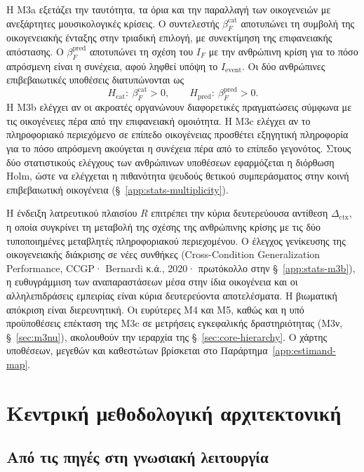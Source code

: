 \documentclass[11pt,a4paper]{article}
\begin{document}
Η M3a εξετάζει την ταυτότητα, τα όρια και την παραλλαγή των οικογενειών με ανεξάρτητες μουσικολογικές κρίσεις. Ο συντελεστής $\beta_F^{\mathrm{cat}}$ αποτυπώνει τη συμβολή της οικογενειακής ένταξης στην τριαδική επιλογή, με συνεκτίμηση της επιφανειακής απόστασης. Ο $\beta_F^{\mathrm{pred}}$ αποτυπώνει τη σχέση του $I_F$ με την ανθρώπινη κρίση για το πόσο απρόσμενη είναι η συνέχεια, αφού ληφθεί υπόψη το $I_{\mathrm{event}}$. Οι δύο ανθρώπινες επιβεβαιωτικές υποθέσεις διατυπώνονται ως
\[
H_{\mathrm{cat}}:\ \beta_F^{\mathrm{cat}}>0,
\qquad
H_{\mathrm{pred}}:\ \beta_F^{\mathrm{pred}}>0.
\]
Η M3b ελέγχει αν οι ακροατές οργανώνουν διαφορετικές πραγματώσεις σύμφωνα με τις οικογένειες πέρα από την επιφανειακή ομοιότητα. Η M3c ελέγχει αν το πληροφοριακό περιεχόμενο σε επίπεδο οικογένειας προσθέτει εξηγητική πληροφορία για το πόσο απρόσμενη ακούγεται η συνέχεια πέρα από το επίπεδο γεγονότος. Στους δύο στατιστικούς ελέγχους των ανθρώπινων υποθέσεων εφαρμόζεται η διόρθωση Holm, ώστε να ελέγχεται η πιθανότητα ψευδούς θετικού συμπεράσματος στην κοινή επιβεβαιωτική οικογένεια (§~\ref{app:stats-multiplicity}).

Η ένδειξη λατρευτικού πλαισίου $R$ επιτρέπει την κύρια δευτερεύουσα αντίθεση $\Delta_{\mathrm{ctx}}$, η οποία συγκρίνει τη μεταβολή της σχέσης της ανθρώπινης κρίσης με τις δύο τυποποιημένες μεταβλητές πληροφοριακού περιεχομένου. Ο έλεγχος γενίκευσης της οικογενειακής διάκρισης σε νέες συνθήκες (Cross-Condition Generalization Performance, CCGP· Bernardi κ.ά., 2020· πρωτόκολλο στην §~\ref{app:stats-m3b}), η ευθυγράμμιση των αναπαραστάσεων μέσα στην ίδια οικογένεια και οι αλληλεπιδράσεις εμπειρίας είναι κύρια δευτερεύοντα αποτελέσματα. Η βιωματική απόκριση είναι διερευνητική. Οι ευρύτερες M4 και M5, καθώς και η υπό προϋποθέσεις επέκταση της M3c σε μετρήσεις εγκεφαλικής δραστηριότητας (M3ν, §~\ref{sec:m3nu}), ακολουθούν την ιεραρχία της §~\ref{sec:core-hierarchy}. Ο χάρτης υποθέσεων, μεγεθών και καθεστώτων βρίσκεται στο Παράρτημα~\ref{app:estimand-map}.

\section{Κεντρική μεθοδολογική αρχιτεκτονική}

\subsection{Από τις πηγές στη γνωσιακή λειτουργία}
\end{document}
